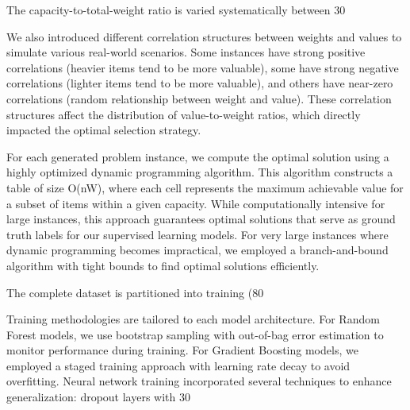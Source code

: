 \documentclass[conference, a4paper]{IEEEtran}
\begin{document}
The capacity-to-total-weight ratio is varied systematically between 30%

We also introduced different correlation structures between weights and values to simulate various real-world scenarios. Some instances have strong positive correlations (heavier items tend to be more valuable), some have strong negative correlations (lighter items tend to be more valuable), and others have near-zero correlations (random relationship between weight and value). These correlation structures affect the distribution of value-to-weight ratios, which directly impacted the optimal selection strategy.

For each generated problem instance, we compute the optimal solution using a highly optimized dynamic programming algorithm. This algorithm constructs a table of size O(nW), where each cell represents the maximum achievable value for a subset of items within a given capacity. While computationally intensive for large instances, this approach guarantees optimal solutions that serve as ground truth labels for our supervised learning models. For very large instances where dynamic programming becomes impractical, we employed a branch-and-bound algorithm with tight bounds to find optimal solutions efficiently.

The complete dataset is partitioned into training (80%

Training methodologies are tailored to each model architecture. For Random Forest models, we use bootstrap sampling with out-of-bag error estimation to monitor performance during training. For Gradient Boosting models, we employed a staged training approach with learning rate decay to avoid overfitting. Neural network training incorporated several techniques to enhance generalization: dropout layers with 30%
\end{document}
